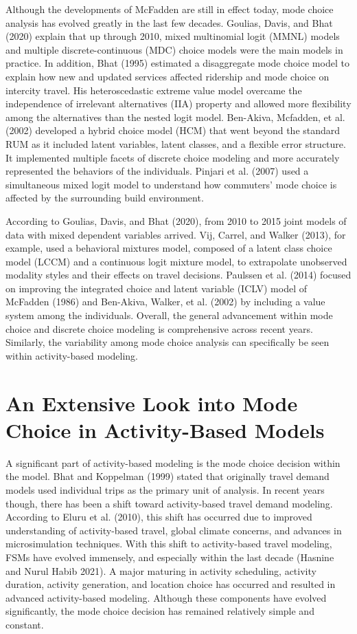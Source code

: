 \documentclass[12pt, oneside, openright]{byuthesis}
\begin{document}
Although the developments of McFadden are still in effect today, mode choice analysis has evolved greatly in the last few decades. Goulias, Davis, and Bhat (2020) explain that up through 2010, mixed multinomial logit (MMNL) models and multiple discrete-continuous (MDC) choice models were the main models in practice. In addition, Bhat (1995) estimated a disaggregate mode choice model to explain how new and updated services affected ridership and mode choice on intercity travel. His heteroscedastic extreme value model overcame the independence of irrelevant alternatives (IIA) property and allowed more flexibility among the alternatives than the nested logit model. Ben-Akiva, Mcfadden, et al. (2002) developed a hybrid choice model (HCM) that went beyond the standard RUM as it included latent variables, latent classes, and a flexible error structure. It implemented multiple facets of discrete choice modeling and more accurately represented the behaviors of the individuals. Pinjari et al. (2007) used a simultaneous mixed logit model to understand how commuters' mode choice is affected by the surrounding build environment.

According to Goulias, Davis, and Bhat (2020), from 2010 to 2015 joint models of data with mixed dependent variables arrived. Vij, Carrel, and Walker (2013), for example, used a behavioral mixtures model, composed of a latent class choice model (LCCM) and a continuous logit mixture model, to extrapolate unobserved modality styles and their effects on travel decisions. Paulssen et al. (2014) focused on improving the integrated choice and latent variable (ICLV) model of McFadden (1986) and Ben-Akiva, Walker, et al. (2002) by including a value system among the individuals. Overall, the general advancement within mode choice and discrete choice modeling is comprehensive across recent years. Similarly, the variability among mode choice analysis can specifically be seen within activity-based modeling.

\hypertarget{lit3}{%
\section{An Extensive Look into Mode Choice in Activity-Based Models}\label{lit3}}

A significant part of activity-based modeling is the mode choice decision within the model. Bhat and Koppelman (1999) stated that originally travel demand models used individual trips as the primary unit of analysis. In recent years though, there has been a shift toward activity-based travel demand modeling. According to Eluru et al. (2010), this shift has occurred due to improved understanding of activity-based travel, global climate concerns, and advances in microsimulation techniques. With this shift to activity-based travel modeling, FSMs have evolved immensely, and especially within the last decade (Hasnine and Nurul Habib 2021). A major maturing in activity scheduling, activity duration, activity generation, and location choice has occurred and resulted in advanced activity-based modeling. Although these components have evolved significantly, the mode choice decision has remained relatively simple and constant.
\end{document}
